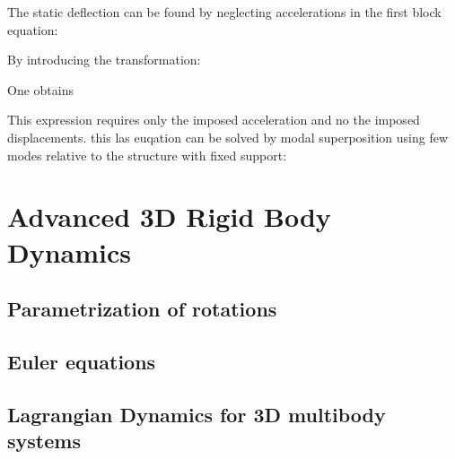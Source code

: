 \documentclass[10pt,a4paper]{scrartcl}
\begin{document}
\begin{multicols*}{2}

The static deflection can be found by neglecting accelerations in the first block equation:


By introducing the transformation:


One obtains


This expression requires only the imposed acceleration and no the imposed displacements. this las euqation can be solved by modal superposition using few modes relative to the structure with fixed support:



\section{Advanced 3D Rigid Body Dynamics}
\subsection{Parametrization of rotations}
\subsection{Euler equations}
\subsection{Lagrangian Dynamics for 3D multibody systems}
\end{multicols*}
\end{document}
